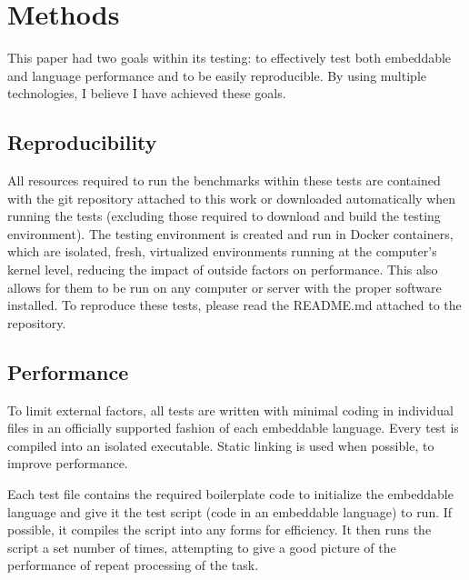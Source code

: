 \section{Methods} \label{sec:methods}
This paper had two goals within its testing: to effectively test both embeddable and language performance and to be easily reproducible. By using multiple technologies, I believe I have achieved these goals.

\subsection{Reproducibility}
All resources required to run the benchmarks within these tests are contained with the git repository attached to this work or downloaded automatically when running the tests (excluding those required to download and build the testing environment). The testing environment is created and run in Docker containers, which are isolated, fresh, virtualized environments running at the computer's kernel level, reducing the impact of outside factors on performance. This also allows for them to be run on any computer or server with the proper software installed. To reproduce these tests, please read the README.md attached to the repository.

\subsection{Performance}
To limit external factors, all tests are written with minimal coding in individual files in an officially supported fashion of each embeddable language. Every test is compiled into an isolated executable. Static linking is used when possible, to improve performance. 

Each test file contains the required boilerplate code to initialize the embeddable language and give it the test script (code in an embeddable language) to run. If possible, it compiles the script into any forms for efficiency. It then runs the script a set number of times, attempting to give a good picture of the performance of repeat processing of the task.

